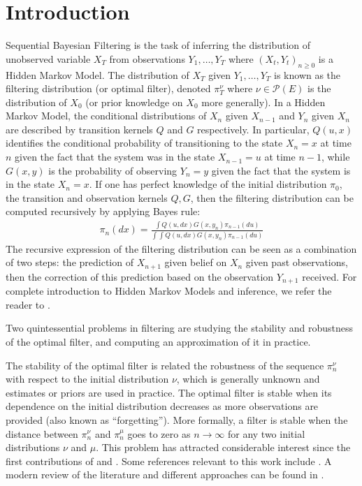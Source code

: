 \section{Introduction}

Sequential Bayesian Filtering is the task of inferring the distribution of unobserved variable $X_T$ from observations $Y_1, \ldots, Y_T$ where $(X_t, Y_t)_{n \geq 0}$ is a Hidden Markov Model. The distribution of $X_T$ given $Y_1, \ldots, Y_T$ is known as the filtering distribution (or optimal filter), denoted $\pi_T^\nu$ where $\nu\in\mathcal P(E)$ is the distribution of $X_0$ (or prior knowledge on $X_0$ more generally). In a Hidden Markov Model, the conditional distributions of $X_n$ given $X_{n-1}$ and $Y_n$ given $X_n$ are described by transition kernels $Q$ and $G$ respectively. In particular, $Q(u,x)$ identifies the conditional probability of transitioning to the state $X_{n}=x$ at time $n$ given the fact that the system was in the state $X_{n-1}=u$ at time $n-1$, while $G(x,y)$ is the probability of observing $Y_{n} = y$ given the fact that the system is in the state $X_{n} = x$. If one has perfect knowledge of the initial distribution $\pi_0$, the transition and observation kernels $Q, G$, then the filtering distribution can be computed recursively by applying Bayes rule:
\begin{align}\label{eq:bayes-0}
\pi_n(dx) = \frac{\int Q(u, dx)G(x, y_n)\pi_{n-1}(du)}{\int\int Q(u, dx)G(x, y_n)\pi_{n-1}(du)}
\end{align}
The recursive expression of the filtering distribution can be seen as a combination of two steps: the prediction of $X_{n+1}$ given belief on $X_n$ given past observations, then the correction of this prediction based on the observation $Y_{n+1}$ received. For complete introduction to Hidden Markov Models and inference, we refer the reader to \cite{cappehmm}.

Two quintessential problems in filtering are studying the stability and robustness of the optimal filter, and computing an approximation of it in practice.

The stability of the optimal filter is related the robustness of the sequence $\pi_n^\nu$ with respect to the initial distribution $\nu$, which is generally unknown and estimates or priors are used in practice. The optimal filter is stable when its dependence on the initial distribution decreases as more observations are provided (also known as ``forgetting''). More formally, a filter is stable when the distance between $\pi_n^\nu$ and $\pi_n^\mu$ goes to zero as $n\to\infty$ for any two initial distributions $\nu$ and $\mu$. This problem has attracted considerable interest since the first contributions of \cite{ocone} and \cite{kunita}. Some references relevant to this work include \cite{oudjane,mcdonald2020,legland99,decastro2017,mitrophanov-hmm-stability-2005}. A modern review of the literature and different approaches can be found in \cite{kim2022duality}.

